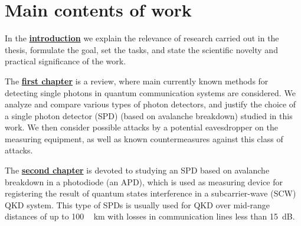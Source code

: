 

 \section*{Main contents of work}
In the \underline{\textbf{introduction}} we explain the relevance of research carried out in the thesis, formulate the goal, set the tasks, and state the scientific novelty and practical significance of the work.

The \underline{\textbf{first chapter}} is a review, where main currently known methods for detecting single photons in quantum communication systems are considered. We analyze and compare various types of photon detectors, and justify the choice of a single photon detector (SPD) (based on avalanche breakdown) studied in this work. We then consider possible attacks by a potential eavesdropper on the measuring equipment, as well as known countermeasures against this class of attacks.



The \underline{\textbf{second chapter}} is devoted to studying an SPD based on avalanche breakdown in a photodiode (an APD), which is used as measuring device for registering the result of quantum states interference in a subcarrier-wave (SCW) QKD system. This type of SPDs is usually used for QKD over mid-range distances of up to 100 ~ km with losses in communication lines less than 15~dB.

